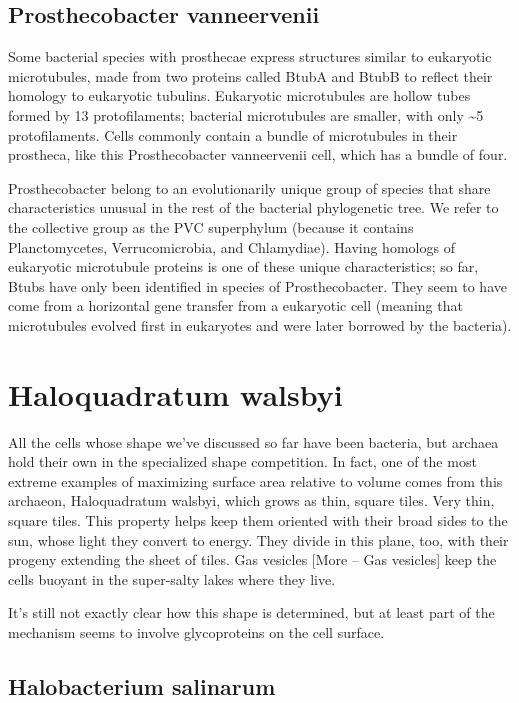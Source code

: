 \documentclass[]{tufte-book}
\begin{document}
\subsection{Prosthecobacter vanneervenii}\label{Bacterial_microtubules}

Some bacterial species with prosthecae express structures similar to
eukaryotic microtubules, made from two proteins called BtubA and BtubB
to reflect their homology to eukaryotic tubulins. Eukaryotic
microtubules are hollow tubes formed by 13 protofilaments; bacterial
microtubules are smaller, with only \textasciitilde{}5 protofilaments.
Cells commonly contain a bundle of microtubules in their prostheca, like
this Prosthecobacter vanneervenii cell, which has a bundle of four.

Prosthecobacter belong to an evolutionarily unique group of species that
share characteristics unusual in the rest of the bacterial phylogenetic
tree. We refer to the collective group as the PVC superphylum (because
it contains Planctomycetes, Verrucomicrobia, and Chlamydiae). Having
homologs of eukaryotic microtubule proteins is one of these unique
characteristics; so far, Btubs have only been identified in species of
Prosthecobacter. They seem to have come from a horizontal gene transfer
from a eukaryotic cell (meaning that microtubules evolved first in
eukaryotes and were later borrowed by the bacteria).

\section{Haloquadratum walsbyi}\label{haloquadratum-walsbyi}

All the cells whose shape we've discussed so far have been bacteria, but
archaea hold their own in the specialized shape competition. In fact,
one of the most extreme examples of maximizing surface area relative to
volume comes from this archaeon, Haloquadratum walsbyi, which grows as
thin, square tiles. Very thin, square tiles. This property helps keep
them oriented with their broad sides to the sun, whose light they
convert to energy. They divide in this plane, too, with their progeny
extending the sheet of tiles. Gas vesicles {[}More -- Gas vesicles{]}
keep the cells buoyant in the super-salty lakes where they live.

It's still not exactly clear how this shape is determined, but at least
part of the mechanism seems to involve glycoproteins on the cell
surface.

\hypertarget{Gas_vesicles}{\subsection{Halobacterium
salinarum}\label{Gas_vesicles}}
\end{document}
